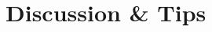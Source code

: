 \documentclass[12pt,preprint]{aastex}
\newcommand{\project}[1]{{\sffamily #1}}
\newcommand{\thisplain}{pipeline}
\newcommand{\this}{\project{\thisplain}}
\newcommand{\sectlabel}[1]{\label{sect:#1}}
\newcommand{\Algo}[1]{Algorithm~\ref{algo:#1}}
\newcommand{\algo}[1]{\Algo{#1}}
\begin{document}

\section{Discussion \& Tips}\sectlabel{advice}


\end{document}
